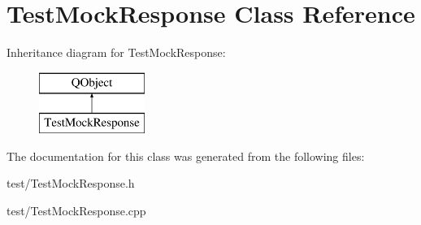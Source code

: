 \hypertarget{class_test_mock_response}{\section{Test\+Mock\+Response Class Reference}
\label{class_test_mock_response}
}
Inheritance diagram for Test\+Mock\+Response\+:\begin{figure}[H]
\begin{center}
\leavevmode
\includegraphics[height=2.000000cm]{class_test_mock_response}
\end{center}
\end{figure}


The documentation for this class was generated from the following files\+:\begin{DoxyCompactItemize}
\item 
test/Test\+Mock\+Response.\+h\item 
test/Test\+Mock\+Response.\+cpp\end{DoxyCompactItemize}

